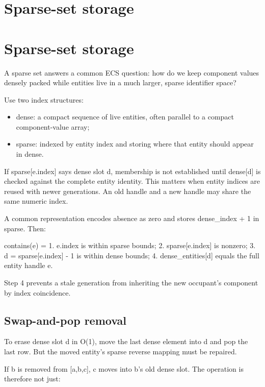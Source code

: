 \hypertarget{appendix-8404d0b1a3e7}{}
\section*{Sparse-set storage}
\section{Sparse-set storage}\label{appendix-8404d0b1a3e7-sparse-set-storage}

A sparse set answers a common ECS question: how do we keep component values densely packed while entities live in a much larger, sparse identifier space?

Use two index structures:

\begin{itemize}
\tightlist
\item
  dense: a compact sequence of live entities, often parallel to a compact component-value array;
\item
  sparse: indexed by entity index and storing where that entity should appear in dense.
\end{itemize}

If sparse{[}e.index{]} says dense slot d, membership is not established until dense{[}d{]} is checked against the complete entity identity. This matters when entity indices are reused with newer generations. An old handle and a new handle may share the same numeric index.

A common representation encodes absence as zero and stores dense\_index + 1 in sparse. Then:

contains(e) = 1. e.index is within sparse bounds; 2. sparse{[}e.index{]} is nonzero; 3. d = sparse{[}e.index{]} - 1 is within dense bounds; 4. dense\_entities{[}d{]} equals the full entity handle e.

Step 4 prevents a stale generation from inheriting the new occupant's component by index coincidence.

\subsection{Swap-and-pop removal}\label{appendix-8404d0b1a3e7-swap-and-pop-removal}

To erase dense slot d in O(1), move the last dense element into d and pop the last row. But the moved entity's sparse reverse mapping must be repaired.

If b is removed from {[}a,b,c{]}, c moves into b's old dense slot. The operation is therefore not just:

